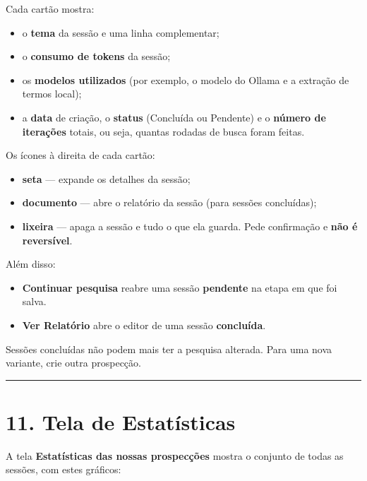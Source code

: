 \documentclass[
  brazilian,
  a4paper,12pt,oneside]{report}
\providecommand{\tightlist}{%
  \setlength{\itemsep}{0pt}\setlength{\parskip}{0pt}}
\begin{document}
Cada cartão mostra:

\begin{itemize}
\tightlist
\item
  o \textbf{tema} da sessão e uma linha complementar;
\item
  o \textbf{consumo de tokens} da sessão;
\item
  os \textbf{modelos utilizados} (por exemplo, o modelo do Ollama e a
  extração de termos local);
\item
  a \textbf{data} de criação, o \textbf{status} (Concluída ou Pendente)
  e o \textbf{número de iterações} totais, ou seja, quantas rodadas de
  busca foram feitas.
\end{itemize}

Os ícones à direita de cada cartão:

\begin{itemize}
\tightlist
\item
  \textbf{seta} --- expande os detalhes da sessão;
\item
  \textbf{documento} --- abre o relatório da sessão (para sessões
  concluídas);
\item
  \textbf{lixeira} --- apaga a sessão e tudo o que ela guarda. Pede
  confirmação e \textbf{não é reversível}.
\end{itemize}

Além disso:

\begin{itemize}
\tightlist
\item
  \textbf{Continuar pesquisa} reabre uma sessão \textbf{pendente} na
  etapa em que foi salva.
\item
  \textbf{Ver Relatório} abre o editor de uma sessão \textbf{concluída}.
\end{itemize}

Sessões concluídas não podem mais ter a pesquisa alterada. Para uma nova
variante, crie outra prospecção.

\begin{center}\rule{0.5\linewidth}{0.5pt}\end{center}

\chapter{11. Tela de Estatísticas}\label{tela-de-estatuxedsticas}

A tela \textbf{Estatísticas das nossas prospecções} mostra o conjunto de
todas as sessões, com estes gráficos:
\end{document}

